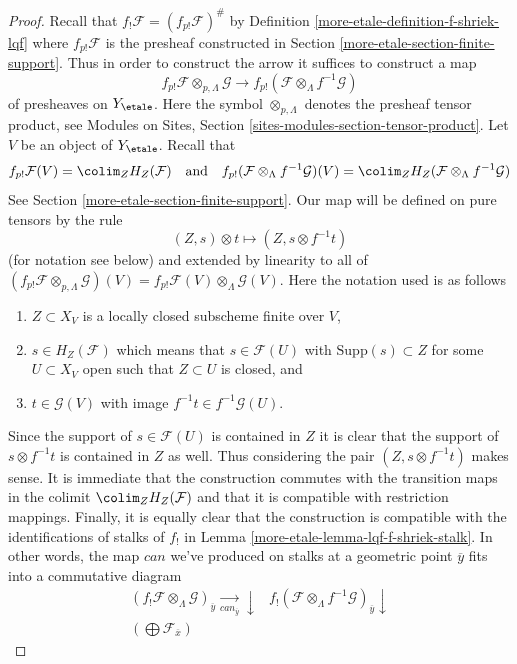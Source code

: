 \begin{proof}
Recall that $f_!\mathcal{F} = (f_{p!}\mathcal{F})^\#$
by Definition \ref{more-etale-definition-f-shriek-lqf} where
$f_{p!}\mathcal{F}$ is the presheaf
constructed in Section \ref{more-etale-section-finite-support}.
Thus in order to construct the arrow it suffices to construct a map
$$
f_{p!}\mathcal{F} \otimes_{p, \Lambda} \mathcal{G}
\longrightarrow
f_{p!}(\mathcal{F} \otimes_\Lambda f^{-1}\mathcal{G})
$$
of presheaves on $Y_\etale$. Here the symbol $\otimes_{p, \Lambda}$
denotes the presheaf tensor product, see
Modules on Sites, Section \ref{sites-modules-section-tensor-product}.
Let $V$ be an object of $Y_\etale$. Recall that
$$
f_{p!}\mathcal{F}(V) = \colim_Z H_Z(\mathcal{F})
\quad\text{and}\quad
f_{p!}(\mathcal{F} \otimes_\Lambda f^{-1}\mathcal{G})(V) =
\colim_Z H_Z(\mathcal{F} \otimes_\Lambda f^{-1}\mathcal{G})
$$
See Section \ref{more-etale-section-finite-support}. Our map will be defined
on pure tensors by the rule
$$
(Z, s) \otimes t \longmapsto (Z, s \otimes f^{-1}t)
$$
(for notation see below) and extended by linearity to all of
$(f_{p!}\mathcal{F} \otimes_{p, \Lambda} \mathcal{G})(V) =
f_{p!}\mathcal{F}(V) \otimes_\Lambda \mathcal{G}(V)$.
Here the notation used is as follows
\begin{enumerate}
\item $Z \subset X_V$ is a locally closed subscheme finite over $V$,
\item $s \in H_Z(\mathcal{F})$ which means that $s \in \mathcal{F}(U)$
with $\text{Supp}(s) \subset Z$ for some $U \subset X_V$ open such that
$Z \subset U$ is closed, and
\item $t \in \mathcal{G}(V)$ with image $f^{-1}t \in f^{-1}\mathcal{G}(U)$.
\end{enumerate}
Since the support of $s \in \mathcal{F}(U)$ is contained in $Z$ it is clear
that the support of $s \otimes f^{-1}t$ is contained in $Z$ as well.
Thus considering the pair $(Z, s \otimes f^{-1}t)$ makes sense.
It is immediate that the construction commutes with the transition
maps in the colimit $\colim_Z H_Z(\mathcal{F})$ and that it is
compatible with restriction mappings. Finally, it is equally clear
that the construction is compatible with the identifications of
stalks of $f_!$ in Lemma \ref{more-etale-lemma-lqf-f-shriek-stalk}.
In other words, the map $can$ we've produced on stalks at a geometric
point $\overline{y}$ fits into a commutative diagram
$$
\begin{array}{cc}(f_!\mathcal{F} \otimes_\Lambda \mathcal{G})_{\overline{y}}
\underset{can_{\overline{y}}}{\longrightarrow}\downarrow & f_!(\mathcal{F} \otimes_\Lambda f^{-1}\mathcal{G})_{\overline{y}} \downarrow \\ (\bigoplus \mathcal{F}_{\overline{x}})

\end{array}$$
\end{proof}
